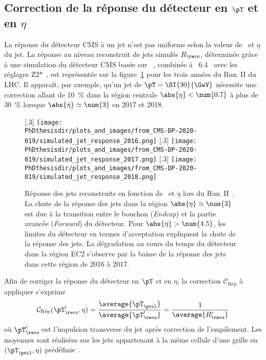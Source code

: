 \subsection{Correction de la réponse du détecteur en $\pT$ et en $\eta$}\label{chapter-JERC-section-CMS-subsec-reponse}
La réponse du détecteur CMS à un jet n'est pas uniforme selon la valeur de \pT\ et $\eta$ du jet.
La réponse au niveau reconstruit de jets simulés $R_\reco$,
déterminée grâce à une simulation du détecteur CMS basée sur \GEANTfour~\cite{geant4_2003,geant4_2006,geant4_2016},
combinée à \PYTHIA~6.4~\cite{pythia6.4}
avec les réglages Z2*~\cite{tunes_2016},
est représentée sur la figure~\ref{fig-simulated_jet_response_RunII} pour les trois années du Run~II du LHC.
Il apparaît, par exemple, qu'un jet de $\pT=\SI{30}{\GeV}$ nécessite une correction allant de \SI{10}{\%} dans la région centrale $\abs{\eta}<\num{0.7}$ à plus de \SI{30}{\%} lorsque $\abs{\eta}\simeq\num{3}$ en 2017 et 2018.
\begin{figure}[h]
\centering
{}[.3\textwidth]
{\texttt{[image: \\PhDthesisdir/plots\_and\_images/from\_CMS-DP-2020-019/simulated\_jet\_response\_2016.png]}}
\hfill
{}[.3\textwidth]
{\texttt{[image: \\PhDthesisdir/plots\_and\_images/from\_CMS-DP-2020-019/simulated\_jet\_response\_2017.png]}}
\hfill
{}[.3\textwidth]
{\texttt{[image: \\PhDthesisdir/plots\_and\_images/from\_CMS-DP-2020-019/simulated\_jet\_response\_2018.png]}}
\caption[Réponse des jets reconstruits en fonction de \pT\ et $\eta$ lors du Run~II.]{Réponse des jets reconstruits en fonction de \pT\ et $\eta$ lors du Run~II~\cite{CMS-DP-2020-019}. La chute de la réponse des jets dans la région $\abs{\eta}\simeq\num{3}$ est due à la transition entre le bouchon (\emph{Endcap}) et la partie avancée (\emph{Forward}) du détecteur. Pour $\abs{\eta}>\num{4.5}$, les limites du détecteur en termes d'acceptation expliquent la chute de la réponse des jets. La dégradation au cours du temps du détecteur dans la région \og EC2 \fg{} s'observe par la baisse de la réponse des jets dans cette région de 2016 à 2017.}
\label{fig-simulated_jet_response_RunII}
\end{figure}
\par Afin de corriger la réponse du détecteur en $\pT$ et en $\eta$, la correction $\mathcal{C}_\text{Rép}$ à appliquer s'exprime
\begin{equation}
\mathcal{C}_\text{Rép}(\pT_\reco', \eta) = \frac{\average{\pT_\ptcl}}{\average{\pT_\reco'}} = \frac{1}{\average{R_\reco'}}
\end{equation}
où $\pT_\reco'$ est l'impulsion transverse du jet après correction de l'empilement.
Les moyennes sont réalisées sur les jets appartenant à la même cellule d'une grille en $(\pT_\ptcl, \eta)$ prédéfinie~\cite{JERC_RunI}.
